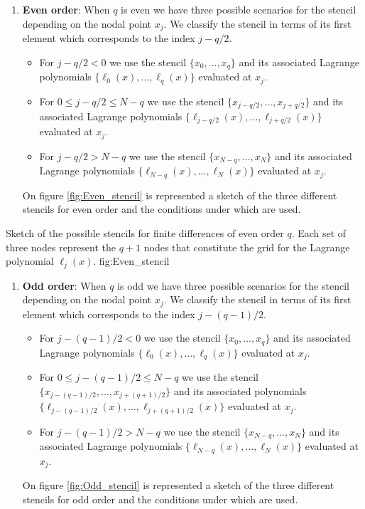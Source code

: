     \begin{enumerate}
    	\item \textbf{Even order}: When $q$ is even we have three possible scenarios for the stencil depending on the nodal point $x_j$. We classify the stencil in terms of its first element which corresponds to the index $j-q/2$.
    	
    	\begin{itemize}
    		\item For $j - q/2 <0$ we use the stencil $\{x_0,\ldots,x_q\}$ and its associated Lagrange polynomials $\{\ell_0(x),\ldots,\ell_q(x)\}$ evaluated at $x_j$.
    		
    		\item For $0 \leq j - q/2 \leq N-q$ we use the stencil $\{x_{j-q/2},\ldots,x_{j+q/2}\}$ and its associated Lagrange polynomials $\{\ell_{j-q/2}(x),\ldots,\ell_{j+q/2}(x)\}$ evaluated at $x_j$.
    		
    		\item For $j - q/2 >N-q$ we use the stencil $\{x_{N-q},\ldots,x_N\}$ and its associated Lagrange polynomials $\{\ell_{N-q}(x),\ldots,\ell_N(x)\}$ evaluated at $x_j$.
    	\end{itemize}
    	On figure \ref{fig:Even_stencil} is represented a sketch of the three different stencils for even order and the conditions under which are used.
    \end{enumerate}
    
    \onegraphw
    {\EvenStencil}
    {Sketch of the possible stencils for finite differences of even order $q$. Each set of three nodes represent the $q+1$ nodes that 
constitute the grid for the Lagrange polynomial $\ell_j(x)$.}
    {fig:Even_stencil}
    
    \begin{enumerate}[resume]
    	\item \textbf{Odd order}: When $q$ is odd we have three possible scenarios for the stencil depending on the nodal point $x_j$. We classify the stencil in terms of its first element which corresponds to the index $j-(q-1)/2$.
    	
    	\begin{itemize}
    		\item For $j - (q-1)/2 <0$ we use the stencil $\{x_0,\ldots,x_q\}$ and its associated Lagrange polynomials $\{\ell_0(x),\ldots,\ell_q(x)\}$ evaluated at $x_j$.
    		
    		\item For $0 \leq j - (q-1)/2 \leq N-q$ we use the stencil $\{x_{j-(q-1)/2},\ldots,x_{j+(q+1)/2}\}$ and its associated polynomials $\{\ell_{j-(q-1)/2}(x),\ldots,\ell_{j+(q+1)/2}(x)\}$ evaluated at $x_j$.
    		
    		\item For $j -(q-1)/2 >N-q$ we use the stencil $\{x_{N-q},\ldots,x_N\}$ and its associated Lagrange polynomials $\{\ell_{N-q}(x),\ldots,\ell_N(x)\}$ evaluated at $x_j$.
    	\end{itemize}
    	On figure \ref{fig:Odd_stencil} is represented a sketch of the three different stencils for odd order and the conditions under which are used.
    \end{enumerate}
    

